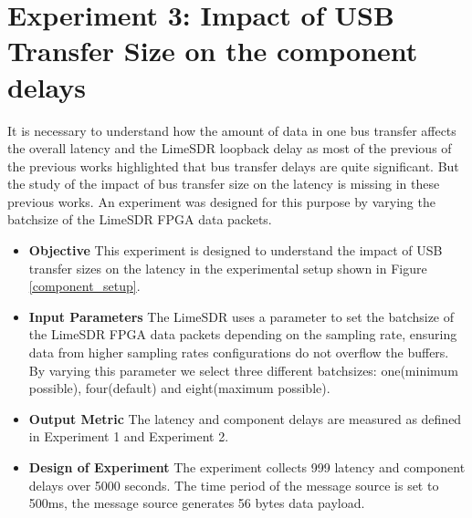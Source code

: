 \section{Experiment 3: Impact of USB Transfer Size on the component delays} \label{exp3}

It is necessary to understand how the amount of data in one bus transfer affects the overall latency and the LimeSDR loopback delay as most of the previous of the previous works highlighted that bus transfer delays are quite significant.
But the study of the impact of bus transfer size on the latency is missing in these previous works.
An experiment was designed for this purpose by varying the batchsize of the LimeSDR FPGA data packets.

\begin{itemize}
    \item \textbf{Objective} This experiment is designed to understand the impact of USB transfer sizes on the latency in the experimental setup shown in Figure \ref{component_setup}.
    \item \textbf{Input Parameters} The LimeSDR uses a parameter to set the batchsize of the LimeSDR FPGA data packets depending on the sampling rate, ensuring data from higher sampling rates configurations do not overflow the buffers.
    By varying this parameter we select three different batchsizes:
    one(minimum possible), four(default) and eight(maximum possible).
    \item \textbf{Output Metric} The latency and component delays are measured as defined in Experiment 1 and Experiment 2.
    \item \textbf{Design of Experiment} The experiment collects 999 latency and component delays over 5000 seconds. The time period of the message source is set to 500ms, the message source generates 56 bytes data payload.
\end{itemize}






